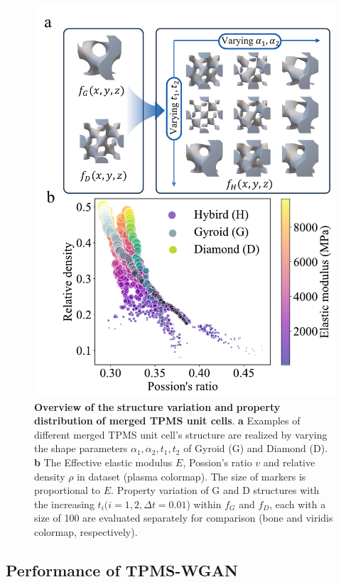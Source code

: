 \documentclass[preprint,review,12pt,authoryear]{elsarticle}
\begin{document}
\begin{figure}
    \centering
    \includegraphics[width=0.75\linewidth]{figures/2.pdf}
    \caption{\textbf{Overview of the} \textbf{structure variation and} \textbf{property} \textbf{distribution} \textbf{of merged TPMS unit cells}. \textbf{a} Examples of different merged TPMS unit cell’s structure are realized by varying the shape parameters $\alpha_1, \alpha_2,t_1,t_2$ of Gyroid (G) and Diamond (D).\textbf{ b }The Effective elastic modulus $E$, Possion’s ratio $v$ and relative density $\rho$ in dataset (plasma colormap). The size of markers is proportional to $E$. Property variation of G and D structures with the increasing $t_i( i=1,2,\Delta t = 0.01$) within $f_G$ and $f_D$, each with a size of 100 are evaluated separately for comparison (bone and viridis colormap, respectively).}
    \label{fig:2}
\end{figure}  

\subsection{Performance of TPMS-WGAN}
\end{document}
